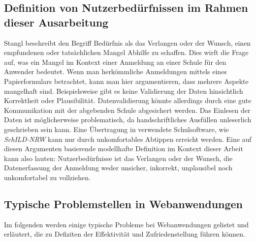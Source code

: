 \subsection{Definition von Nutzerbedürfnissen im Rahmen dieser Ausarbeitung }
\cite{stangl} 
Stangl beschreibt den Begriff Bedürfnis als \glqq das Verlangen oder der Wunsch, einen empfundenen oder tatsächlichen Mangel Abhilfe zu schaffen.\glqq \cite{stangl} Dies wirft die Frage auf, was ein Mangel im Kontext einer Anmeldung an einer Schule für den Anwender bedeutet. Wenn man herkömmliche Anmeldungen mittels eines Papierformulars betrachtet, kann man hier argumentieren, dass mehrere Aspekte mangelhaft sind. Beispielsweise gibt es keine Validierung der Daten hinsichtlich Korrektheit oder Plausibilität.  Datenvalidierung könnte allerdings durch eine gute Kommunikation mit der abgebenden Schule abgesichert werden. Das Einlesen der Daten ist möglicherweise problematisch, da handschriftliches Ausfüllen unleserlich geschrieben sein kann. Eine Übertragung in verwendete Schulsoftware, wie \textit{SchILD-NRW} kann nur durch unkomfortables Abtippen erreicht werden.
Eine auf diesen Argumenten basierende modellhafte Definition im Kontext dieser Arbeit kann also lauten: \glqq Nutzerbedürfnisse ist das Verlangen oder der Wunsch, die Datenerfassung der Anmeldung weder unsicher, inkorrekt, unplausibel noch unkomfortabel zu vollziehen\grqq{}.

\subsection{Typische Problemstellen in Webanwendungen}
Im folgenden werden einige typische Probleme bei Webanwendungen gelistet und erläutert, die zu Defiziten der Effektivität und Zufriedenstellung führen können.

